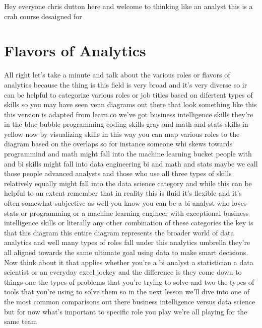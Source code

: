Hey everyone chris dutton here and welcome to thinking like an analyst this is a crah course desaigned for

\section{Flavors of Analytics}

All right let's take a minute and talk about the various roles or flavors of analytics because the thing is this field
is very broad and it's very diverse so ir can be helpful to categorize various roles or job titles
based on difertent types of skills so you may have seen venn diagrams out there that look something like this
this version is adapted from learn.co we've got business intelligence skills they're in the blue bubble programming coding skills gray and math  and stats skills in yellow now by
visualizing skills in this way you can map various roles to the diagram based on the overlaps so for instance someone
whi skews towards programmind and math might fall into the machine learning bucket people with and bi skills might fall into data engineering
bi and math and stats maybe we call those people advanced analysts and those who use all three types of skills
relatively equally might fall into the data science category and while this can be helpful to an extent remember that in reality this is fluid
it's flexible and it's often somewhat subjective as well you know you can be a bi analyst who loves stats or programming or a machine
learning engineer with exceptional business intelligence skills or literally any other combination of these categories the key is that this diagram this entire
diagram represents the broader world of data analytics and well many types of roles fall under this analytics umbrella they're
all aligned towards the same ultimate goal using data to make smart decisions. Now think about it that applies whether you're a bi analyst
a statistician a data scientist or an everyday excel jockey and the difference is they come down to things one the types of problems that you're trying to solve
and two the types of tools that you're  using to solve them so in the next lesson we'll dive into one of the most common comparisons out 
there business intelligence versus data  science but for now what's important to specific role you play we're all playing 
for the same team 